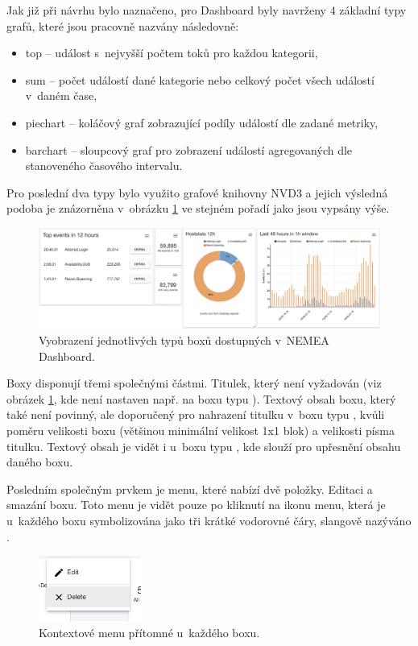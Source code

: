 Jak již při návrhu bylo naznačeno, pro Dashboard byly navrženy 4 základní typy grafů, které jsou pracovně nazvány následovně:

\begin{itemize}
    \item top -- událost s~nejvyšší počtem toků pro každou kategorii,
    \item sum -- počet událostí dané kategorie nebo celkový počet všech událostí v~daném čase,
    \item piechart -- koláčový graf zobrazující podíly událostí dle zadané metriky,
    \item barchart -- sloupcový graf pro zobrazení událostí agregovaných dle stanoveného časového intervalu.
\end{itemize}

Pro poslední dva typy bylo využito grafové knihovny NVD3 a jejich výsledná podoba je znázorněna v~obrázku \ref{fig:boxes} ve stejném pořadí jako jsou vypsány výše.

\begin{figure}[ht]
    \centering
    \includegraphics[width=\textwidth]{fig/boxes.png}
    \caption{Vyobrazení jednotlivých typů boxů dostupných v~NEMEA Dashboard.} \label{fig:boxes}
\end{figure}

Boxy disponují třemi společnými částmi. Titulek, který není vyžadován (viz obrázek \ref{fig:boxes}, kde není nastaven např. na boxu typu ). Textový obsah boxu, který také není povinný, ale doporučený pro nahrazení titulku v~boxu typu , kvůli poměru velikosti boxu (většinou minimální velikost 1x1 blok) a velikosti písma titulku. Textový obsah je vidět i u~boxu typu , kde slouží pro upřesnění obsahu daného boxu.

Posledním společným prvkem je menu, které nabízí dvě položky. Editaci a smazání boxu. Toto menu je vidět pouze po kliknutí na ikonu menu, která je u~každého boxu symbolizována jako tři krátké vodorovné čáry, slangově nazýváno .

\begin{figure}[ht]
    \centering
    \includegraphics[width=0.3\textwidth]{fig/box_menu.png}
    \caption{Kontextové menu přítomné u~každého boxu.} \label{fig:box_menu}
\end{figure}


